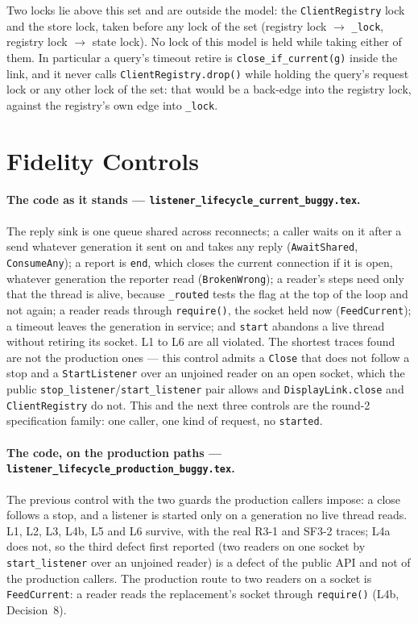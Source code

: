 \documentclass[a4paper,10pt,fleqn]{article}
\begin{document}
Two locks lie above this set and are outside the model: the
\texttt{ClientRegistry} lock and the store lock, taken before any lock of the
set (registry lock $\to$ \texttt{\_lock}, registry lock $\to$ state lock).
No lock of this model is held while taking either of them.  In particular a
query's timeout retire is \texttt{close\_if\_current(g)} inside the link, and
it never calls \texttt{ClientRegistry.drop()} while holding the query's request
lock or any other lock of the set: that would be a back-edge into the registry
lock, against the registry's own edge into \texttt{\_lock}.

\section{Fidelity Controls}
\label{sec:fidelity}

\paragraph{The code as it stands ---
\texttt{listener\_lifecycle\_current\_buggy.tex}.}
The reply sink is one queue shared across reconnects; a caller waits on it
after a send whatever generation it sent on and takes any reply
(\texttt{AwaitShared}, \texttt{ConsumeAny}); a report is \texttt{end}, which
closes the current connection if it is open, whatever generation the reporter
read (\texttt{BrokenWrong}); a reader's steps need only that the thread is
alive, because \texttt{\_routed} tests the flag at the top of the loop and not
again; a reader reads through \texttt{require()}, the socket held now
(\texttt{FeedCurrent}); a timeout leaves the generation in service; and
\texttt{start} abandons a live thread without retiring its socket.  L1 to L6
are all violated.  The shortest traces found are not the production ones ---
this control admits a \texttt{Close} that does not follow a stop and a
\texttt{StartListener} over an unjoined reader on an open socket, which the
public \texttt{stop\_listener}/\texttt{start\_listener} pair allows and
\texttt{DisplayLink.close} and \texttt{ClientRegistry} do not.  This and the
next three controls are the round-2 specification family: one caller, one kind
of request, no \texttt{started}.

\paragraph{The code, on the production paths ---
\texttt{listener\_lifecycle\_production\_buggy.tex}.}
The previous control with the two guards the production callers impose: a
close follows a stop, and a listener is started only on a generation no live
thread reads.  L1, L2, L3, L4b, L5 and L6 survive, with the real R3-1 and
SF3-2 traces; L4a does not, so the third defect first reported (two readers on
one socket by \texttt{start\_listener} over an unjoined reader) is a defect of
the public API and not of the production callers.  The production route to two
readers on a socket is \texttt{FeedCurrent}: a reader reads the replacement's
socket through \texttt{require()} (L4b, Decision~8).
\end{document}
